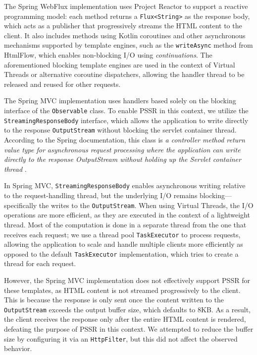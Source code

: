 The Spring WebFlux implementation uses Project Reactor to support a reactive
programming model: each method returns a \texttt{Flux<String>} as the response
body, which acts as a publisher that progressively streams the HTML content to
the client. It also includes methods using Kotlin coroutines and other
asynchronous mechanisms supported by template engines, such as the
\texttt{writeAsync} method from HtmlFlow, which enables non-blocking I/O
using \textit{continuations}. The aforementioned blocking template engines are used in
the context of Virtual Threads or alternative coroutine dispatchers, allowing
the handler thread to be released and reused for other requests.

The Spring MVC implementation uses handlers based solely on the blocking
interface of the \texttt{Observable} class. To enable PSSR in this context, we utilize
the \texttt{StreamingResponseBody} interface, which allows the application to
write directly to the response \texttt{OutputStream} without blocking the servlet
container thread. According to the Spring documentation, this class is \textit{a
controller method return value type for asynchronous request processing where
the application can write directly to the response OutputStream without holding
up the Servlet container thread} \citeauthor{Spring-StreamingResponseBody}.

In Spring MVC, \texttt{StreamingResponseBody} enables asynchronous writing relative to
the request-handling thread, but the underlying I/O remains
blocking—specifically the writes to the \texttt{OutputStream}. When using Virtual
Threads, the I/O operations are more efficient, as they are executed in the
context of a lightweight thread. Most of the computation is done in a separate
thread from the one that receives each request; we use a thread pool
\texttt{TaskExecutor} to process requests, allowing the application to scale and
handle multiple clients more efficiently as opposed to the default
\texttt{TaskExecutor} implementation, which tries to create a thread for each request.

However, the Spring MVC implementation does not effectively support PSSR for
these templates, as HTML content is not streamed progressively to the client.
This is because the response is only sent once the content written to the
\texttt{OutputStream} exceeds the output buffer size, which defaults to 8KB\@. As a
result, the client receives the response only after the entire HTML content is
rendered, defeating the purpose of PSSR in this context. We attempted to reduce
the buffer size by configuring it via an \texttt{HttpFilter}, but this did not affect
the observed behavior.

